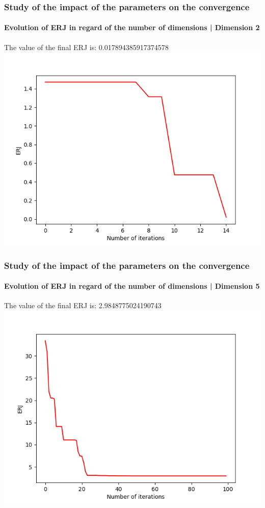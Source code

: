 \documentclass{beamer}
\begin{document}
\begin{frame}
	\frametitle{\color{velvet} Study of the impact of the parameters on the convergence}
	\framesubtitle{Evolution of ERJ in regard of the number of dimensions | Dimension 2}
	The value of the final ERJ is: 0.017894385917374578
	\includegraphics[scale=0.5]{Graphs/1.png}
	\end{frame}
	\begin{frame}
	\frametitle{\color{velvet} Study of the impact of the parameters on the convergence}
	\framesubtitle{Evolution of ERJ in regard of the number of dimensions | Dimension 5}
	The value of the final ERJ is: 2.9848775024190743
	\includegraphics[scale=0.5]{Graphs/2.png}
	\end{frame}
\end{document}
